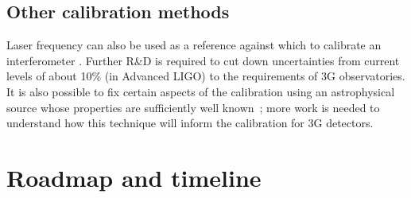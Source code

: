 \subsection{Other calibration methods}
Laser frequency can also be used as a reference against which to calibrate an interferometer \cite{Leong2012, PhysRevD.95.062003}. Further R\&D is required to cut down uncertainties from current levels of about 10\% (in Advanced LIGO) to the requirements of 3G observatories.
It is also possible to fix certain aspects of the calibration using an astrophysical source whose properties are sufficiently well known~\cite{CalibrationGW170817,Pitkin:2015kgm}; more work is needed to understand how this technique will inform the calibration for 3G detectors.


\section{Roadmap and timeline}


